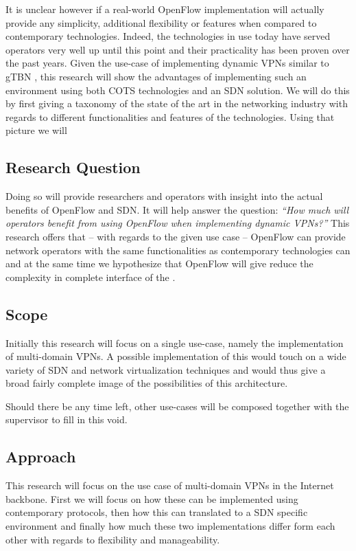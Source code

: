 \documentclass[oneside,twocolumn,8pt,a4paper]{article}
\begin{document}
	It is unclear however if a real-world OpenFlow implementation will actually provide any simplicity, additional flexibility or features when compared to contemporary technologies. Indeed, the technologies in use today have served operators very well up until this point and their practicality has been proven over the past years. Given the use-case of implementing dynamic VPNs similar to gTBN \cite{gtbn}, this research will show the advantages of implementing such an environment using both COTS technologies and an SDN solution. We will do this by first giving a taxonomy of the state of the art in the networking industry with regards to different functionalities and features of the technologies. Using that picture we will 
			
		\subsection*{Research Question} %
		\label{sub:research_question}
		Doing so will provide researchers and operators with insight into the actual benefits of OpenFlow and SDN. It will help answer the question: \textsl{``How much will operators benefit from using OpenFlow when implementing dynamic VPNs?''}
		This research offers that -- with regards to the given use case -- OpenFlow can provide network operators with the same functionalities as contemporary technologies can and at the same time we hypothesize that OpenFlow will give reduce the complexity in complete interface of the .

		
		\subsection*{Scope} %
		\label{sub:scope}
		Initially this research will focus on a single use-case, namely the implementation of multi-domain VPNs. A possible implementation of this would touch on a wide variety of SDN and network virtualization techniques and would thus give a broad fairly complete image of the possibilities of this architecture.
		
		Should there be any time left, other use-cases will be composed together with the supervisor to fill in this void.
		
		\subsection*{Approach} %
		\label{sub:approach}
		This research will focus on the use case of multi-domain VPNs in the Internet backbone. First we will focus on how these can be implemented using contemporary protocols, then how this can translated to a SDN specific environment and finally how much these two implementations differ form each other with regards to flexibility and manageability.
\end{document}

